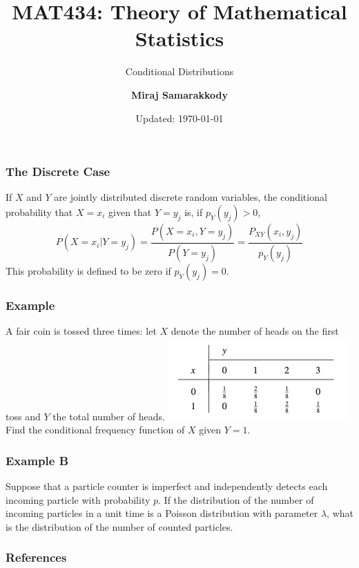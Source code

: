 \documentclass{beamer}
\title{MAT434: Theory of Mathematical Statistics}
\subtitle{Conditional Distributions \cite{RJA2006}}
\author{\textbf{Miraj Samarakkody}}
\institute{Tougaloo College}
\date{Updated: \today}
\begin{document}
\begin{frame}
    \titlepage
\end{frame}

\begin{frame}
    \frametitle{The Discrete Case}

    If \(X\) and \(Y\) are jointly distributed discrete random variables, the conditional probability that \(X=x_i\) given that \(Y=y_j\) is, if \(p_Y(y_j)>0\), \[
    P(X=x_i|Y=y_j) = \dfrac{P(X=x_i,Y=y_j)}{P(Y=y_j)}= \dfrac{P_{XY}(x_i,y_j)}{p_Y(y_j)}
    \] 
    This probability is defined to be zero if \(p_Y(y_j)=0\).

\end{frame}

\begin{frame}
    \frametitle{Example}

    A fair coin is tossed three times: let \(X\) denote the number of heads on the first toss and \(Y\) the total number of heads. 
    \includegraphics[scale=0.7]{Figures/fig_11.png}\\
    Find the conditional frequency function of \(X\) given \(Y=1\).

\end{frame}

\begin{frame}
    \frametitle{Example B}

    Suppose that a particle counter is imperfect and independently detects each incoming particle with probability \(p\). If the distribution of the number of incoming particles in a unit time is a Poisson distribution with parameter \(\lambda\), what is the distribution of the number of counted particles. 

\end{frame}


\begin{frame}
    \frametitle{References}
\end{frame}
\end{document}
